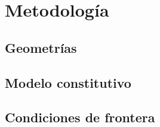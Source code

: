 \chapter{Metodología}

\section{Geometrías}



\section{Modelo constitutivo}



\section{Condiciones de frontera}

